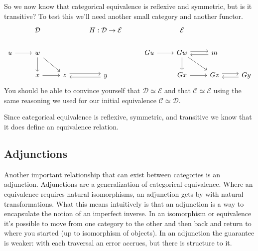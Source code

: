 \documentclass[12pt]{article}
\theoremstyle{definition}
\begin{document}
So we now know that categorical equivalence is reflexive and symmetric, but is it transitive?
To test this we'll need another small category and another functor.
\[\begin{tikzcd}
        & {\mathcal{D}} && {H:\mathcal{D}\rightarrow\mathcal{E}} && {\mathcal{E}} \\
        u & w &&& Gu & Gw & m \\
        & x & z & y && Gx & Gz & Gy
        \arrow[from=2-6, to=3-6]
        \arrow[from=2-1, to=2-2]
        \arrow[from=2-2, to=3-2]
        \arrow[from=3-2, to=3-3]
        \arrow[from=2-2, to=3-3]
        \arrow[shift left, from=3-3, to=3-4]
        \arrow[shift left, from=3-4, to=3-3]
        \arrow[from=2-6, to=3-7]
        \arrow[from=3-6, to=3-7]
        \arrow[from=2-5, to=2-6]
        \arrow[shift left, from=2-6, to=2-7]
        \arrow[shift left, from=2-7, to=2-6]
        \arrow[shift left, from=3-7, to=3-8]
        \arrow[shift left, from=3-8, to=3-7]
    \end{tikzcd}\]
You should be able to convince yourself that $\mathcal{D}\simeq\mathcal{E}$ and that $\mathcal{C}\simeq\mathcal{E}$ using the same reasoning we used for our initial equivalence $\mathcal{C}\simeq\mathcal{D}$.

Since categorical equivalence is reflexive, symmetric, and transitive we know that it does define an equivalence relation.



\subsection*{Adjunctions}
Another important relationship that can exist between categories is an adjunction.
Adjunctions are a generalization of categorical equivalence.
Where an equivalence requires natural isomorphisms, an adjunction gets by with natural transformations.
What this means intuitively is that an adjunction is a way to encapsulate the notion of an imperfect inverse.
In an isomorphism or equivalence it's possible to move from one category to the other and then back and return to where you started (up to isomorphism of objects).
In an adjunction the guarantee is weaker: with each traversal an error accrues, but there is structure to it.
\end{document}
